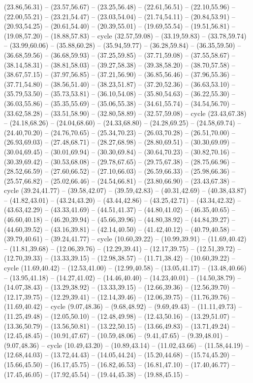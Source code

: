 {(23.86,56.31) -- (23.57,56.67) -- (23.25,56.48) -- (22.61,56.51) -- (22.10,55.96) -- (22.00,55.21) -- (23.21,54.47) -- (23.03,54.04) -- (21.74,54.11) -- (20.84,53.91) -- (20.93,54.25) -- (20.61,54.40) -- (20.39,55.01) -- (19.69,55.54) -- (19.51,56.81) -- (19.08,57.20) -- (18.88,57.83) -- cycle (32.57,59.08) -- (33.19,59.83) -- (33.78,59.74) -- (33.99,60.06) -- (35.88,60.28) -- (35.94,59.77) -- (36.28,59.84) -- (36.35,59.50) -- (36.68,59.56) -- (36.68,59.93) -- (37.25,59.85) -- (37.71,59.08) -- (37.55,58.67) -- (38.14,58.31) -- (38.81,58.03) -- (39.27,58.38) -- (39.38,58.20) -- (38.70,57.58) -- (38.67,57.15) -- (37.97,56.85) -- (37.21,56.90) -- (36.85,56.46) -- (37.96,55.36) -- (37.71,54.80) -- (38.56,51.40) -- (38.23,51.87) -- (37.20,52.36) -- (36.63,53.10) -- (35.79,53.50) -- (35.73,53.81) -- (36.10,54.08) -- (35.80,54.63) -- (36.22,55.30) -- (36.03,55.86) -- (35.35,55.69) -- (35.06,55.38) -- (34.61,55.74) -- (34.54,56.70) -- (33.62,58.28) -- (33.51,58.90) -- (32.80,58.89) -- (32.57,59.08) -- cycle (23.43,67.38) -- (24.18,68.26) -- (24.04,68.60) -- (24.33,68.80) -- (24.28,69.25) -- (24.58,69.74) -- (24.40,70.20) -- (24.76,70.65) -- (25.34,70.23) -- (26.03,70.28) -- (26.51,70.00) -- (26.93,69.03) -- (27.48,68.71) -- (28.27,68.98) -- (28.80,69.51) -- (30.30,69.09) -- (30.04,69.45) -- (30.01,69.94) -- (30.30,69.84) -- (30.64,70.23) -- (30.82,70.16) -- (30.39,69.42) -- (30.53,68.08) -- (29.78,67.65) -- (29.75,67.38) -- (28.75,66.96) -- (28.52,66.59) -- (27.60,66.52) -- (27.10,66.03) -- (26.59,66.33) -- (25.98,66.36) -- (25.57,66.82) -- (25.02,66.46) -- (24.54,66.81) -- (23.80,66.90) -- (23.43,67.38) -- cycle (39.24,41.77) -- (39.58,42.07) -- (39.59,42.83) -- (40.31,42.69) -- (40.38,43.87) -- (41.82,43.01) -- (43.24,43.20) -- (43.44,42.86) -- (43.25,42.71) -- (43.34,42.32) -- (43.63,42.29) -- (43.33,41.69) -- (44.51,41.37) -- (44.80,41.02) -- (46.35,40.65) -- (46.60,40.18) -- (46.20,39.94) -- (45.66,39.96) -- (44.80,38.92) -- (44.84,39.27) -- (44.60,39.52) -- (43.16,39.81) -- (42.14,40.50) -- (41.42,40.12) -- (40.79,40.58) -- (39.79,40.61) -- (39.24,41.77) -- cycle (10.60,39.22) -- (10.99,39.91) -- (11.69,40.42) -- (11.81,39.68) -- (12.06,39.76) -- (12.29,39.41) -- (12.17,39.75) -- (12.51,39.72) -- (12.70,39.33) -- (13.33,39.15) -- (12.98,38.57) -- (11.71,38.42) -- (10.60,39.22) -- cycle (11.69,40.42) -- (12.53,41.00) -- (12.99,40.58) -- (13.05,41.17) -- (13.48,40.66) -- (13.95,41.18) -- (14.27,41.02) -- (14.46,40.40) -- (14.23,40.01) -- (14.50,38.79) -- (14.07,38.43) -- (13.29,38.92) -- (13.33,39.15) -- (12.66,39.36) -- (12.56,39.70) -- (12.17,39.75) -- (12.29,39.41) -- (12.14,39.46) -- (12.06,39.75) -- (11.76,39.76) -- (11.69,40.42) -- cycle (9.07,48.36) -- (9.68,48.92) -- (9.69,49.43) -- (11.11,49.73) -- (11.25,49.48) -- (12.05,50.10) -- (12.48,49.98) -- (12.43,50.16) -- (13.29,51.07) -- (13.36,50.79) -- (13.56,50.81) -- (13.22,50.15) -- (13.66,49.83) -- (13.71,49.24) -- (12.45,48.45) -- (10.91,47.67) -- (10.59,48.06) -- (9.41,47.65) -- (9.39,48.01) -- (9.07,48.36) -- cycle (10.49,43.20) -- (10.89,43.14) -- (11.02,43.66) -- (11.58,44.19) -- (12.68,44.03) -- (13.72,44.43) -- (14.05,44.24) -- (15.20,44.68) -- (15.74,45.20) -- (15.66,45.50) -- (16.17,45.75) -- (16.82,46.53) -- (16.81,47.10) -- (17.40,46.77) -- (17.45,46.05) -- (17.92,45.54) -- (19.44,45.38) -- (19.88,45.15) -- }
